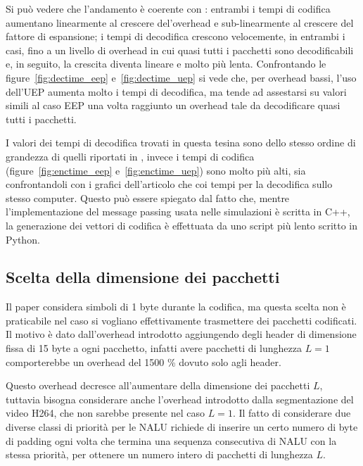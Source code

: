 \documentclass[italian, a4paper, 12pt]{article}
\begin{document}
%
Si può vedere che l'andamento è coerente con \cite{uep}: entrambi i
tempi di codifica aumentano linearmente al crescere del'overhead e
sub-linearmente al crescere del fattore di espansione; i tempi di
decodifica crescono velocemente, in entrambi i casi, fino a un livello
di overhead in cui quasi tutti i pacchetti sono decodificabili e, in
seguito, la crescita diventa lineare e molto più lenta.
%
Confrontando le figure~\ref{fig:dectime_eep} e~\ref{fig:dectime_uep}
si vede che, per overhead bassi, l'uso dell'UEP aumenta molto i tempi
di decodifica, ma tende ad assestarsi su valori simili al caso EEP una
volta raggiunto un overhead tale da decodificare quasi tutti i
pacchetti.

I valori dei tempi di decodifica trovati in questa tesina sono dello
stesso ordine di grandezza di quelli riportati in \cite{uep}, invece i
tempi di codifica (figure~\ref{fig:enctime_eep}
e~\ref{fig:enctime_uep}) sono molto più alti, sia confrontandoli con i
grafici dell'articolo che coi tempi per la decodifica sullo stesso
computer.
%
Questo può essere spiegato dal fatto che, mentre l'implementazione del
message passing usata nelle simulazioni è scritta in C++, la
generazione dei vettori di codifica è effettuata da uno script più
lento scritto in Python.

\subsection{Scelta della dimensione dei pacchetti}
\label{sec:pktsize}
Il paper \cite{uep} considera simboli di 1 byte durante la codifica,
ma questa scelta non è praticabile nel caso si vogliano effettivamente
trasmettere dei pacchetti codificati.
%
Il motivo è dato dall'overhead introdotto aggiungendo degli header di
dimensione fissa di 15 byte a ogni pacchetto, infatti avere pacchetti
di lunghezza $L=1$ comporterebbe un overhead del 1500 \% dovuto solo
agli header.

Questo overhead decresce all'aumentare della dimensione dei pacchetti
$L$, tuttavia bisogna considerare anche l'overhead introdotto dalla
segmentazione del video H264, che non sarebbe presente nel caso $L=1$.
%
%
Il fatto di considerare due diverse classi di priorità per le NALU
richiede di inserire un certo numero di byte di padding ogni volta che
termina una sequenza consecutiva di NALU con la stessa priorità, per
ottenere un numero intero di pacchetti di lunghezza $L$.
\end{document}
